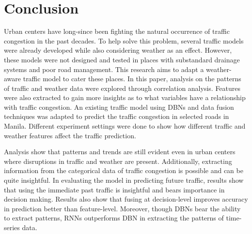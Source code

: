 \chapter{Conclusion}

Urban centers have long-since been fighting the natural occurrence of traffic congestion in the past decades. To help solve this problem, several traffic models were already developed while also considering weather as an effect. However, these models were not designed and tested in places with substandard drainage systems and poor road management. This research aims to adapt a weather-aware traffic model to cater these places. In this paper, analysis on the patterns of traffic and weather data were explored through correlation analysis. Features were also extracted to gain more insights as to what variables have a relationship with traffic congestion. An existing traffic model using DBNs and data fusion techniques was adapted to predict the traffic congestion in selected roads in Manila. Different experiment settings were done to show how different traffic and weather features affect the traffic prediction. 

Analysis show that patterns and trends are still evident even in urban centers where disruptions in traffic and weather are present. Additionally, extracting information from the categorical data of traffic congestion is possible and can be quite insightful. In evaluating the model in predicting future traffic, results show that using the immediate past traffic is insightful and bears importance in decision making. Results also show that fusing at decision-level improves accuracy in prediction better than feature-level. Moreover, though DBNs bear the ability to extract patterns, RNNs outperforms DBN in extracting the patterns of time-series data.
